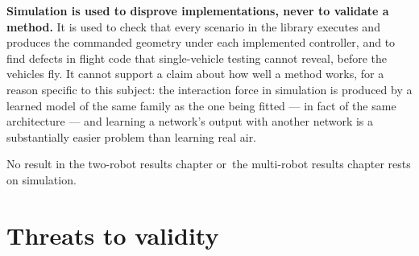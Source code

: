\textbf{Simulation is used to disprove implementations, never to validate a method.} It is used to
check that every scenario in the library executes and produces the commanded geometry under each
implemented controller, and to find defects in flight code that single-vehicle testing cannot
reveal, before the vehicles fly. It cannot support a claim about how well a method works, for a
reason specific to this subject: the interaction force in simulation is produced by a learned model
of the same family as the one being fitted --- in fact of the same architecture --- and learning a
network's output with another network is a substantially easier problem than learning real air.

No result in the two-robot results chapter or~the multi-robot results chapter rests on simulation.

\section{Threats to validity}
\label{sec:setup-validity}

